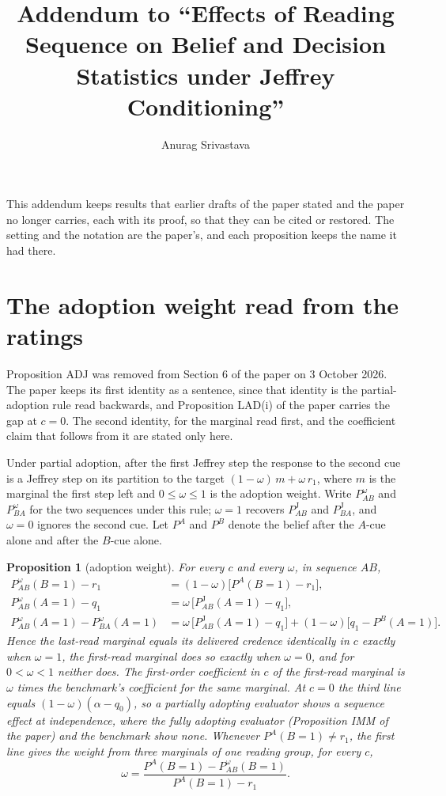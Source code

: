 \documentclass[11pt,a4paper]{article}
\title{Addendum to ``Effects of Reading Sequence on Belief and Decision Statistics under Jeffrey Conditioning''}
\author{Anurag Srivastava}
\date{}
\newtheorem{proposition}{Proposition}
\newcommand{\PJ}{P^{\mathrm{J}}}
\begin{document}
\maketitle

This addendum keeps results that earlier drafts of the paper stated and the paper no
longer carries, each with its proof, so that they can be cited or restored. The setting
and the notation are the paper's, and each proposition keeps the name it had there.

\section{The adoption weight read from the ratings}

Proposition ADJ was removed from Section 6 of the paper on 3 October 2026. The paper keeps
its first identity as a sentence, since that identity is the partial-adoption rule read
backwards, and Proposition LAD(i) of the paper carries the gap at $c=0$. The second
identity, for the marginal read first, and the coefficient claim that follows from it are
stated only here.

Under partial adoption, after the first Jeffrey step the response to the second cue is a
Jeffrey step on its partition to the target $(1-\omega)\,m+\omega\,r_1$, where $m$ is the
marginal the first step left and $0\le\omega\le1$ is the adoption weight. Write
$P^{\omega}_{AB}$ and $P^{\omega}_{BA}$ for the two sequences under this rule; $\omega=1$
recovers $\PJ_{AB}$ and $\PJ_{BA}$, and $\omega=0$ ignores the second cue. Let $P^{A}$ and
$P^{B}$ denote the belief after the $A$-cue alone and after the $B$-cue alone.

\renewcommand{\theproposition}{ADJ}%
\begin{proposition}[adoption weight]\label{prop:ADJ}
For every $c$ and every $\omega$, in sequence $AB$,
\begin{align*}
P^{\omega}_{AB}(B{=}1)-r_1 &=(1-\omega)\bigl[P^{A}(B{=}1)-r_1\bigr],\\
P^{\omega}_{AB}(A{=}1)-q_1 &=\omega\,\bigl[\PJ_{AB}(A{=}1)-q_1\bigr],\\
P^{\omega}_{AB}(A{=}1)-P^{\omega}_{BA}(A{=}1)
  &=\omega\,\bigl[\PJ_{AB}(A{=}1)-q_1\bigr]+(1-\omega)\bigl[q_1-P^{B}(A{=}1)\bigr].
\end{align*}
Hence the last-read marginal equals its delivered credence identically in $c$
exactly when $\omega=1$, the first-read marginal does so exactly when
$\omega=0$, and for $0<\omega<1$ neither does. The first-order coefficient in
$c$ of the first-read marginal is $\omega$ times the benchmark's coefficient
for the same marginal. At $c=0$ the third line equals $(1-\omega)(\alpha-q_0)$,
so a partially adopting evaluator shows a sequence effect at independence, where
the fully adopting evaluator (Proposition IMM of the paper) and the benchmark
show none. Whenever $P^{A}(B{=}1)\neq r_1$, the first line gives the weight from
three marginals of one reading group, for every $c$,
\[
  \omega=\frac{P^{A}(B{=}1)-P^{\omega}_{AB}(B{=}1)}{P^{A}(B{=}1)-r_1}.
\]
\end{proposition}
\end{document}
